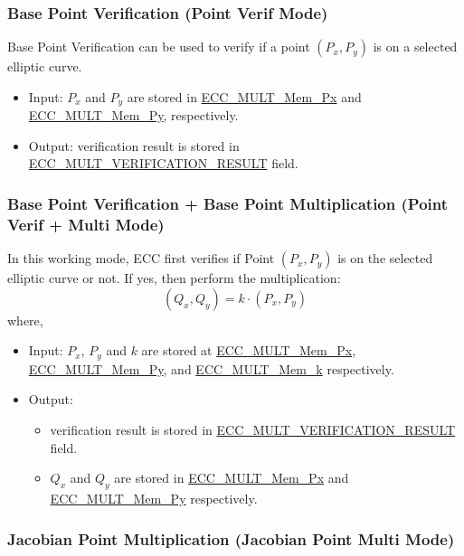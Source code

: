 \documentclass[main\_\_EN.tex]{subfiles}
\begin{document}
\subsubsection{Base Point Verification (Point Verif Mode)}

Base Point Verification can be used to verify if a point  $(P_x,P_y)$ is on a selected elliptic curve.

\begin{itemize}
    \item Input: $P_x$ and $P_y$ are stored in \hyperref[tab:ecc-memory]{ECC\_MULT\_Mem\_Px} and \hyperref[tab:ecc-memory]{ECC\_MULT\_Mem\_Py}, respectively.
    \item Output: verification result is stored in \hyperref[fielddesc:ECCMULTVERIFICATIONRESULT]{ECC\_MULT\_VERIFICATION\_RESULT} field.
\end{itemize}

\subsubsection{Base Point Verification + Base Point Multiplication (Point Verif + Multi Mode)}

In this working mode, ECC first verifies if Point $(P_x,P_y)$ is on the selected elliptic curve or not. If yes, then perform the multiplication:
\[
(Q_x,Q_y) = k \cdot (P_x,P_y)
\]
where,
\begin{itemize}
    \item Input: $P_x$, $P_y$ and $k$ are stored at \hyperref[tab:ecc-memory]{ECC\_MULT\_Mem\_Px}, \hyperref[tab:ecc-memory]{ECC\_MULT\_Mem\_Py}, and \hyperref[tab:ecc-memory]{ECC\_MULT\_Mem\_k} respectively.
    \item Output:
    \begin{itemize}
        \item verification result is stored in \hyperref[fielddesc:ECCMULTVERIFICATIONRESULT]{ECC\_MULT\_VERIFICATION\_RESULT} field.
        \item $Q_x$ and $Q_y$ are stored in \hyperref[tab:ecc-memory]{ECC\_MULT\_Mem\_Px} and \hyperref[tab:ecc-memory]{ECC\_MULT\_Mem\_Py} respectively.
    \end{itemize}
\end{itemize}

\subsubsection{Jacobian Point Multiplication (Jacobian Point Multi Mode)}
\end{document}

